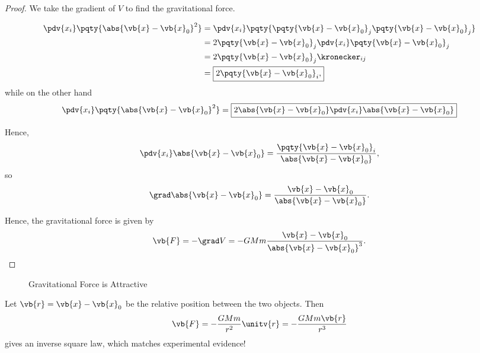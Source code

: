 \begin{proof}
    We take the gradient of \(V\) to find the gravitational force.

    \begin{subequations}\begin{align}
        \pdv{x_i} \pqty{\abs{\vb{x} - \vb{x}_0}^2} &= \pdv{x_i} \pqty{\pqty{\vb{x} - \vb{x}_0}_j \pqty{\vb{x} - \vb{x}_0}_j} \\
        &= 2 \pqty{\vb{x} - \vb{x}_0}_j \pdv{x_i} \pqty{\vb{x} - \vb{x}_0}_j \\
        &= 2 \pqty{\vb{x} - \vb{x}_0}_j \kronecker_{ij} \\
        &= \boxed{2 \pqty{\vb{x} - \vb{x}_0}_i,}
    \end{align}\end{subequations}
    while on the other hand
    \begin{equation}
        \pdv{x_i} \pqty{\abs{\vb{x} - \vb{x}_0}^2} = \boxed{2 \abs{\vb{x} - \vb{x}_0} \pdv{x_i} \abs{\vb{x} - \vb{x}_0}}
    \end{equation}

    Hence,
    \begin{equation}
        \pdv{x_i} \abs{\vb{x} - \vb{x}_0} = \frac{\pqty{\vb{x} - \vb{x}_0}_i}{\abs{\vb{x} - \vb{x}_0}},
    \end{equation}
    so
    \begin{equation}
        \grad \abs{\vb{x} - \vb{x}_0} = \frac{\vb{x} - \vb{x}_0}{\abs{\vb{x} - \vb{x}_0}}.
    \end{equation}

    Hence, the gravitational force is given by
    \begin{equation}
        \vb{F} = - \grad V = - G M m \frac{\vb{x} - \vb{x}_0}{\abs{\vb{x} - \vb{x}_0}^3}.
    \end{equation}    
\end{proof}

\begin{figure}[ht!]
    \centering
    \caption{Gravitational Force is Attractive}
    \label{fig:gravitational-force-attractive}%
\end{figure}

Let \(\vb{r} = \vb{x} - \vb{x}_0\) be the relative position between the two objects. Then
\begin{equation}
    \vb{F} = - \frac{G M m}{r^2} \unitv{r} = - \frac{G M m \vb{r}}{r^3}
\end{equation}
gives an inverse square law, which matches experimental evidence!

